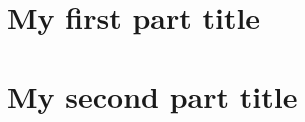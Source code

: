 \documentclass[12pt,a4paper,openright,tikz]{lmpsthesis}
\begin{document}
\frontmatter
\setcounter{page}{1}                        %


\mainmatter


\clearpage\null

\part{My first part title}


\clearpage\null

\part{My second part title}


\clearpage\null

\thesisappendix


\clearpage\null

\backmatter
\chapter*{\bibname}
\printbibliography[heading=bibintoc]
\end{document}

